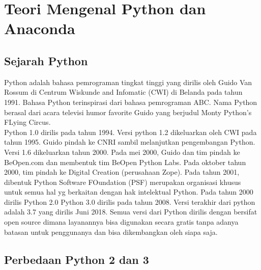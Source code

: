 \chapter{Teori Mengenal Python dan Anaconda}
\section{Sejarah Python}
Python adalah bahasa pemrograman tingkat tinggi yang dirilis oleh Guido Van Rossum di Centrum Wiskunde and Infomatic (CWI) di Belanda pada tahun 1991. Bahasa Python terinspirasi dari bahasa pemrograman ABC. Nama Python berasal dari acara televisi humor favorite Guido yang berjudul Monty Python's FLying Circus.
\\ Python 1.0 dirilis pada tahun 1994. Versi python 1.2 dikeluarkan oleh CWI pada tahun 1995. Guido pindah ke CNRI sambil melanjutkan pengembangan Python. Versi 1.6 dikeluarkan tahun 2000. Pada mei 2000, Guido dan tim pindah ke BeOpen.com dan membentuk tim BeOpen Python Labs. Pada oktober tahun 2000, tim pindah ke Digital Creation (perusahaan Zope). Pada tahun 2001, dibentuk Python Software FOundation (PSF) merupakan organisasi khusus untuk semua hal yg berkaitan dengan hak intelektual Python. Pada tahun 2000 dirilis Python 2.0 Python 3.0 dirilis pada tahun 2008. Versi terakhir dari python adalah 3.7 yang dirilis Juni 2018. Semua versi dari Python dirilis dengan bersifat open source dimana layanannya bisa digunakan secara gratis tanpa adanya batasan untuk penggunanya dan bisa dikembangkan oleh siapa saja.

\section{Perbedaan Python 2 dan 3}

